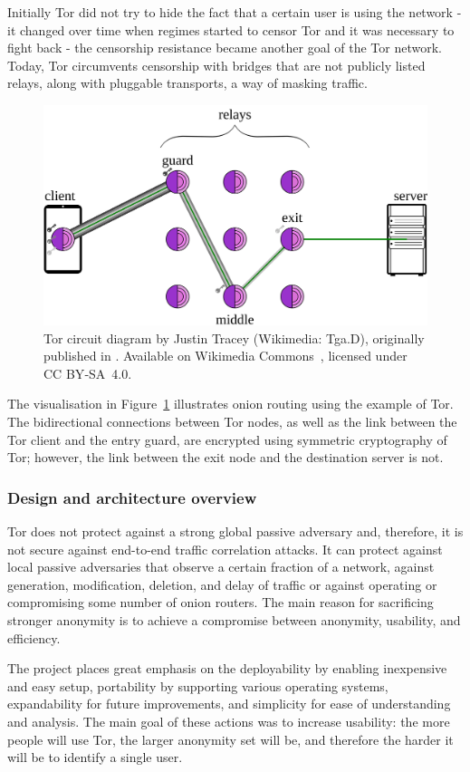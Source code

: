 Initially Tor did not try to hide the fact that a certain user is using the network - it changed over time when regimes started to censor Tor and it was necessary to fight back - the censorship resistance became another goal of the Tor network. Today, Tor circumvents censorship with bridges that are not publicly listed relays, along with pluggable transports, a way of masking traffic.

\begin{figure}[ht]
  \centering
  \includegraphics[width=0.75\linewidth]{Images/tor.png}
  \caption{Tor circuit diagram by Justin Tracey (Wikimedia: Tga.D), originally published in \cite{tracey_thesis}. Available on Wikimedia Commons~\cite{tracey_tor_circuit}, licensed under CC BY‑SA 4.0.}
  \label{fig:tor_circuit}
\end{figure}

The visualisation in Figure~\ref{fig:tor_circuit} illustrates onion routing using the example of Tor. The bidirectional connections between Tor nodes, as well as the link between the Tor client and the entry guard, are encrypted using symmetric cryptography of Tor; however, the link between the exit node and the destination server is not.

\subsubsection{Design and architecture overview}
Tor does not protect against a strong global passive adversary and, therefore, it is not secure against end-to-end traffic correlation attacks. It can protect against local passive adversaries that observe a certain fraction of a network, against generation, modification, deletion, and delay of traffic or against operating or compromising some number of onion routers. The main reason for sacrificing stronger anonymity is to achieve a compromise between anonymity, usability, and efficiency.

The project places great emphasis on the deployability by enabling inexpensive and easy setup, portability by supporting various operating systems, expandability for future improvements, and simplicity for ease of understanding and analysis. The main goal of these actions was to increase usability: the more people will use Tor, the larger anonymity set will be, and therefore the harder it will be to identify a single user.

